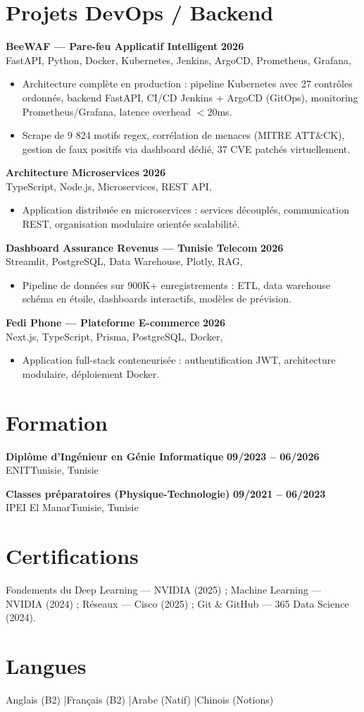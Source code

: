 \documentclass[a4paper,10pt]{article}
\newcommand{\cventry}[4]{\textbf{#1} \hfill \textbf{#4}\\[1pt]#2{\ifx\relax#3\relax\else, #3\fi}\par\vspace{1pt}}
\begin{document}
\section{Projets DevOps / Backend}
\cventry{BeeWAF --- Pare-feu Applicatif Intelligent}{FastAPI, Python, Docker, Kubernetes, Jenkins, ArgoCD, Prometheus, Grafana}{}{2026}
\begin{itemize}
  \item Architecture complète en production : pipeline Kubernetes avec 27 contrôles ordonnés, backend FastAPI, CI/CD Jenkins + ArgoCD (GitOps), monitoring Prometheus/Grafana, latence overhead $<$20ms.
  \item Scrape de 9 824 motifs regex, corrélation de menaces (MITRE ATT\&CK), gestion de faux positifs via dashboard dédié, 37 CVE patchés virtuellement.
\end{itemize}
\cventry{Architecture Microservices}{TypeScript, Node.js, Microservices, REST API}{}{2026}
\begin{itemize}
  \item Application distribuée en microservices : services découplés, communication REST, organisation modulaire orientée scalabilité.
\end{itemize}
\cventry{Dashboard Assurance Revenus --- Tunisie Telecom}{Streamlit, PostgreSQL, Data Warehouse, Plotly, RAG}{}{2026}
\begin{itemize}
  \item Pipeline de données sur 900K+ enregistrements : ETL, data warehouse schéma en étoile, dashboards interactifs, modèles de prévision.
\end{itemize}
\cventry{Fedi Phone --- Plateforme E-commerce}{Next.js, TypeScript, Prisma, PostgreSQL, Docker}{}{2026}
\begin{itemize}
  \item Application full-stack conteneurisée : authentification JWT, architecture modulaire, déploiement Docker.
\end{itemize}
\section{Formation}
\cventry{Diplôme d'Ingénieur en Génie Informatique}{ENIT}{Tunisie}{09/2023 -- 06/2026}
\cventry{Classes préparatoires (Physique-Technologie)}{IPEI El Manar}{Tunisie}{09/2021 -- 06/2023}
\section{Certifications}
Fondements du Deep Learning --- NVIDIA (2025) ; Machine Learning --- NVIDIA (2024) ; Réseaux --- Cisco (2025) ; Git \& GitHub --- 365 Data Science (2024).
\section{Langues}
Anglais (B2) \quad|\quad Français (B2) \quad|\quad Arabe (Natif) \quad|\quad Chinois (Notions)
\end{document}
